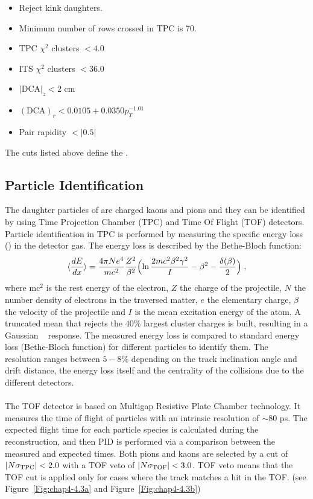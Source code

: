 \begin{itemize}
\item Reject kink daughters.
\item Minimum number of rows crossed in TPC is 70.
\item TPC $\chi^{2}$ clusters $<4.0$
\item ITS $\chi^{2}$ clusters $<36.0$
\item $|\text{DCA}|_{z} < 2 $ cm
\item $(\text{DCA})_{r}< 0.0105+ 0.0350p_{T}^{-1.01}$
\item  Pair rapidity $< |0.5|$
\end{itemize}


The cuts listed above define the .


\subsection{Particle Identification}
\label{par:4.2b}
The daughter particles of \kzero are charged kaons and pions and they can be identified by using Time Projection Chamber (TPC) and Time Of Flight (TOF) detectors.  Particle identification in TPC is performed by measuring the specific energy loss (\dedx) in the detector gas. The energy loss is described by the Bethe-Bloch function:
\begin{equation}
 \langle{dE\over dx}\rangle = {4\pi N e^{4} \over mc^{2}} {Z^{2} \over \beta^{2}} \Bigl(\ln{2mc^{2}\beta^{2}\gamma^{2} \over I} - \beta^{2} - {\delta(\beta) \over 2} \Bigr) \; ,
 \label{eq.:Bethe}
\end{equation}
\noindent where mc$^{2}$ is the rest energy of the electron, $Z$ the charge of the projectile, $N$ the number density of electrons in the traversed matter, $e$ the elementary charge, $\beta$ the velocity of the projectile and $I$ is the mean excitation energy of the atom. A truncated mean that rejects the $40\%$ largest cluster charges is built, resulting in a Gaussian \dedx~ response. The measured energy loss is compared to standard energy loss (Bethe-Bloch function) for different particles to identify them. The \dedx~ resolution ranges between $5 - 8\%$ depending on the track inclination angle and drift distance, the energy loss itself and the centrality of the collisions due to the different detectors. \\
\\
The TOF detector is based on Multigap Resistive Plate Chamber technology. It measures the time of flight of particles with an intrinsic resolution of $\sim 80 $ ps. The expected flight time for each particle species is calculated during the reconstruction, and then PID is performed via a comparison between the measured and expected times. Both pions and kaons are selected by a cut of $|N\sigma_{\rm{TPC}} | < 2.0$ with a TOF veto of $|N\sigma_{\rm{TOF}} | < 3.0$. TOF veto means that the TOF cut is applied only for cases where the track matches a hit in the TOF. (see \mbox{Figure \ref{Fig:chap4-4.3a}} and \mbox{Figure \ref{Fig:chap4-4.3b}})



